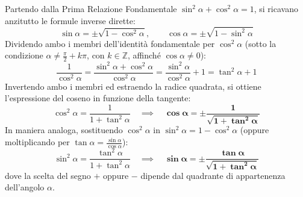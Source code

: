 \documentclass[11pt,a4paper,oneside]{report}
\begin{document}
Partendo dalla Prima Relazione Fondamentale $\sin^2\alpha + \cos^2\alpha = 1$, si ricavano anzitutto le formule inverse dirette:
\begin{equation}
    \sin\alpha = \pm\sqrt{1 - \cos^2\alpha}, \qquad \cos\alpha = \pm\sqrt{1 - \sin^2\alpha}
\end{equation}
Dividendo ambo i membri dell'identità fondamentale per $\cos^2\alpha$ (sotto la condizione $\alpha \neq \frac{\pi}{2} + k\pi$, con $k \in \mathbb{Z}$, affinché $\cos\alpha \neq 0$):
\begin{equation}
    \frac{1}{\cos^2\alpha} = \frac{\sin^2\alpha + \cos^2\alpha}{\cos^2\alpha} = \frac{\sin^2\alpha}{\cos^2\alpha} + 1 = \tan^2\alpha + 1
\end{equation}
Invertendo ambo i membri ed estraendo la radice quadrata, si ottiene l'espressione del coseno in funzione della tangente:
\begin{equation}
    \cos^2\alpha = \frac{1}{1 + \tan^2\alpha} \quad \implies \quad \mathbf{\cos\alpha = \pm \frac{1}{\sqrt{1 + \tan^2\alpha}}}
\end{equation}
In maniera analoga, sostituendo $\cos^2\alpha$ in $\sin^2\alpha = 1 - \cos^2\alpha$ (oppure moltiplicando per $\tan\alpha = \frac{\sin\alpha}{\cos\alpha}$):
\begin{equation}
    \sin^2\alpha = \frac{\tan^2\alpha}{1 + \tan^2\alpha} \quad \implies \quad \mathbf{\sin\alpha = \pm \frac{\tan\alpha}{\sqrt{1 + \tan^2\alpha}}}
\end{equation}
dove la scelta del segno $+$ oppure $-$ dipende dal quadrante di appartenenza dell'angolo $\alpha$.
\end{document}
